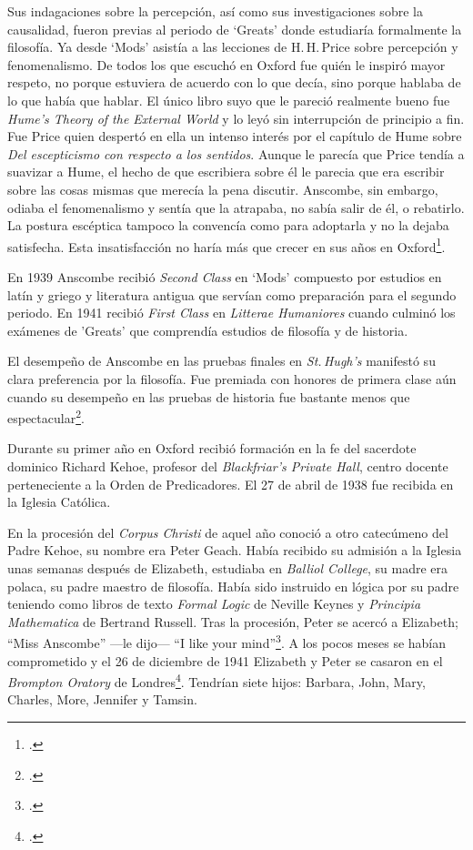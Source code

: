 Sus indagaciones sobre la percepción, así como sus investigaciones sobre la causalidad, fueron previas al periodo de `Greats' donde estudiaría formalmente la filosofía. Ya desde `Mods' asistía a las lecciones de H.\,H.\,Price sobre percepción y fenomenalismo. De todos los que escuchó en Oxford fue quién le inspiró mayor respeto, no porque estuviera de acuerdo con lo que decía, sino porque hablaba de lo que había que hablar. El único libro suyo que le pareció realmente bueno fue \emph{Hume's Theory of the External World} y lo leyó sin interrupción de principio a fin. Fue Price quien despertó en ella un intenso interés por el capítulo de Hume sobre \emph{Del escepticismo con respecto a los sentidos}. Aunque le parecía que Price tendía a suavizar a Hume, el hecho de que escribiera sobre él le parecia que era escribir sobre las cosas mismas que merecía la pena discutir. Anscombe, sin embargo, odiaba el fenomenalismo y sentía que la atrapaba, no sabía salir de él, o rebatirlo. La postura escéptica tampoco la convencía como para adoptarla y no la dejaba satisfecha. Esta insatisfacción no haría más que crecer en sus años en Oxford\footcites[Cf.][Introduction, viii]{anscombe1981metaphysics} [y][26]{torralba2005accion}.

En 1939 Anscombe recibió \emph{Second Class} en `Mods' compuesto por estudios en latín y griego y literatura antigua que servían como preparación para el segundo periodo. En 1941 recibió \emph{First Class} en \emph{Litterae Humaniores} cuando culminó los exámenes de 'Greats' que comprendía estudios de filosofía y de historia.

El desempeño de Anscombe en las pruebas finales en \emph{St.\,Hugh's} manifestó su clara preferencia por la filosofía. Fue premiada con honores de primera clase aún cuando su desempeño en las pruebas de historia fue bastante menos que espectacular\footcite[Cf.][3]{teichmann2008ans}.

Durante su primer año en Oxford recibió formación en la fe del sacerdote dominico Richard Kehoe, profesor del \emph{Blackfriar's Private Hall}, centro docente perteneciente a la Orden de Predicadores. El 27 de abril de 1938 fue recibida en la Iglesia Católica.

En la procesión del \emph{Corpus Christi} de aquel año conoció a otro catecúmeno del Padre Kehoe, su nombre era Peter Geach. Había recibido su admisión a la Iglesia unas semanas después de Elizabeth, estudiaba en \emph{Balliol College}, su madre era polaca, su padre maestro de filosofía. Había sido instruido en lógica por su padre teniendo como libros de texto \emph{Formal Logic} de Neville Keynes y \emph{Principia Mathematica} de Bertrand Russell. Tras la procesión, Peter se acercó a Elizabeth; \enquote{Miss Anscombe} ---le dijo--- \enquote{I like your mind}\footcite[Cf.][187]{kenny2016fellows}. A los pocos meses se habían comprometido y el 26 de diciembre de 1941 Elizabeth y Peter se casaron en el \emph{Brompton Oratory} de Londres\footcite[Cf.][33]{teichman2002fellows}. Tendrían siete hijos: Barbara, John, Mary, Charles, More, Jennifer y Tamsin.

